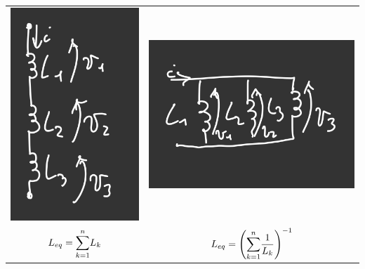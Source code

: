 \documentclass{article}
\begin{document}
\begin{center}
    \begin{tabular}{c c}
        \includegraphics[scale=0.37]{Image/Induttori in serie.png}
        &
        \includegraphics[scale=0.37]{Image/Induttori in parallelo.png}\\
        $L_{eq} = \mathlarger{\sum}_{k=1}^nL_k$
        &
        $ L_{eq} = \left( \mathlarger{\sum}_{k=1}^n \dfrac{1}{L_k} \right)^{-1} $
    \end{tabular}
\end{center}
\end{document}
